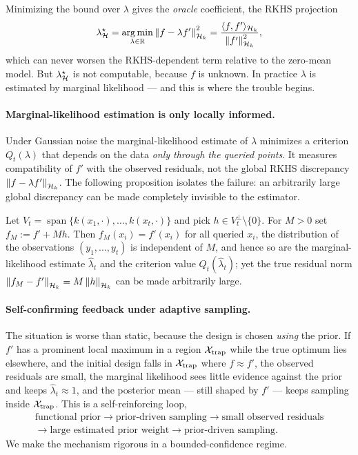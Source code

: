 Minimizing the bound over $\lambda$ gives the \emph{oracle} coefficient, the RKHS
projection
\begin{equation}
  \lambda^\star_{\mathcal{H}}=\operatorname*{arg\,min}_{\lambda\in\mathbb{R}}\left\lVert f-\lambda f'\right\rVert_{\mathcal{H}_k}^2
  =\frac{\langle f, f'\rangle_{\mathcal{H}_k}}{\left\lVert f'\right\rVert_{\mathcal{H}_k}^2},
  \label{eq:prior-oracle}
\end{equation}
which can never worsen the RKHS-dependent term relative to the zero-mean model.
But $\lambda^\star_{\mathcal{H}}$ is not computable, because $f$ is unknown. In practice
$\lambda$ is estimated by marginal likelihood --- and this is where the trouble
begins.

\paragraph{Marginal-likelihood estimation is only locally informed.}
Under Gaussian noise the marginal-likelihood estimate of $\lambda$ minimizes a
criterion $Q_t(\lambda)$ that depends on the data \emph{only through the queried
points}. It measures compatibility of $f'$ with the observed residuals, not the
global RKHS discrepancy $\left\lVert f-\lambda f'\right\rVert_{\mathcal{H}_k}$. The following proposition
isolates the failure: an arbitrarily large global discrepancy can be made
completely invisible to the estimator.

\begin{proposition}
\label{prop:prior-local}
Let $V_t=\operatorname{span}\{k(x_1,\cdot),\dots,k(x_t,\cdot)\}$ and pick
$h\in V_t^{\perp}\setminus\{0\}$. For $M>0$ set $f_M:=f'+Mh$. Then
$f_M(x_i)=f'(x_i)$ for all queried $x_i$, the distribution of the observations
$(y_1,\dots,y_t)$ is independent of $M$, and hence so are the marginal-likelihood
estimate $\widehat\lambda_t$ and the criterion value $Q_t(\widehat\lambda_t)$;
yet the true residual norm $\left\lVert f_M-f'\right\rVert_{\mathcal{H}_k}=M\left\lVert h\right\rVert_{\mathcal{H}_k}$ can be made
arbitrarily large.
\end{proposition}

\paragraph{Self-confirming feedback under adaptive sampling.}
The situation is worse than static, because the design is chosen \emph{using} the
prior. If $f'$ has a prominent local maximum in a region $\mathcal{X}_{\mathrm{trap}}$
while the true optimum lies elsewhere, and the initial design falls in
$\mathcal{X}_{\mathrm{trap}}$ where $f\approx f'$, the observed residuals are small, the
marginal likelihood sees little evidence against the prior and keeps
$\widehat\lambda_t\approx1$, and the posterior mean --- still shaped by $f'$ ---
keeps sampling inside $\mathcal{X}_{\mathrm{trap}}$. This is a self-reinforcing loop,
\[
\begin{gathered}
\text{functional prior}\rightarrow\text{prior-driven sampling}
\rightarrow\text{small observed residuals}
\\[0.1cm]
\rightarrow\text{large estimated prior weight}
\rightarrow\text{prior-driven sampling}.
\end{gathered}
\]
We make the mechanism rigorous in a bounded-confidence regime.

